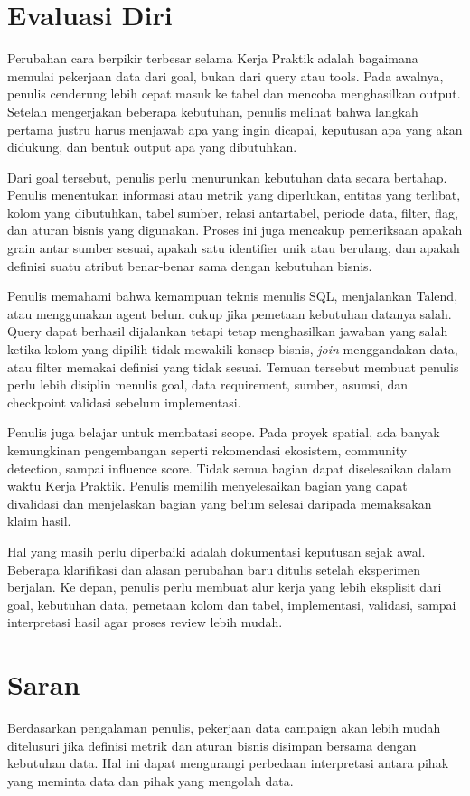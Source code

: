 \section{Evaluasi Diri}
Perubahan cara berpikir terbesar selama Kerja Praktik adalah bagaimana memulai pekerjaan data dari goal, bukan dari query atau tools. Pada awalnya, penulis cenderung lebih cepat masuk ke tabel dan mencoba menghasilkan output. Setelah mengerjakan beberapa kebutuhan, penulis melihat bahwa langkah pertama justru harus menjawab apa yang ingin dicapai, keputusan apa yang akan didukung, dan bentuk output apa yang dibutuhkan.

Dari goal tersebut, penulis perlu menurunkan kebutuhan data secara bertahap. Penulis menentukan informasi atau metrik yang diperlukan, entitas yang terlibat, kolom yang dibutuhkan, tabel sumber, relasi antartabel, periode data, filter, flag, dan aturan bisnis yang digunakan. Proses ini juga mencakup pemeriksaan apakah grain antar sumber sesuai, apakah satu identifier unik atau berulang, dan apakah definisi suatu atribut benar-benar sama dengan kebutuhan bisnis.

Penulis memahami bahwa kemampuan teknis menulis SQL, menjalankan Talend, atau menggunakan agent belum cukup jika pemetaan kebutuhan datanya salah. Query dapat berhasil dijalankan tetapi tetap menghasilkan jawaban yang salah ketika kolom yang dipilih tidak mewakili konsep bisnis, \textit{join} menggandakan data, atau filter memakai definisi yang tidak sesuai. Temuan tersebut membuat penulis perlu lebih disiplin menulis goal, data requirement, sumber, asumsi, dan checkpoint validasi sebelum implementasi.

Penulis juga belajar untuk membatasi scope. Pada proyek spatial, ada banyak kemungkinan pengembangan seperti rekomendasi ekosistem, community detection, sampai influence score. Tidak semua bagian dapat diselesaikan dalam waktu Kerja Praktik. Penulis memilih menyelesaikan bagian yang dapat divalidasi dan menjelaskan bagian yang belum selesai daripada memaksakan klaim hasil.

Hal yang masih perlu diperbaiki adalah dokumentasi keputusan sejak awal. Beberapa klarifikasi dan alasan perubahan baru ditulis setelah eksperimen berjalan. Ke depan, penulis perlu membuat alur kerja yang lebih eksplisit dari goal, kebutuhan data, pemetaan kolom dan tabel, implementasi, validasi, sampai interpretasi hasil agar proses review lebih mudah.

\section{Saran}
Berdasarkan pengalaman penulis, pekerjaan data campaign akan lebih mudah ditelusuri jika definisi metrik dan aturan bisnis disimpan bersama dengan kebutuhan data. Hal ini dapat mengurangi perbedaan interpretasi antara pihak yang meminta data dan pihak yang mengolah data.

